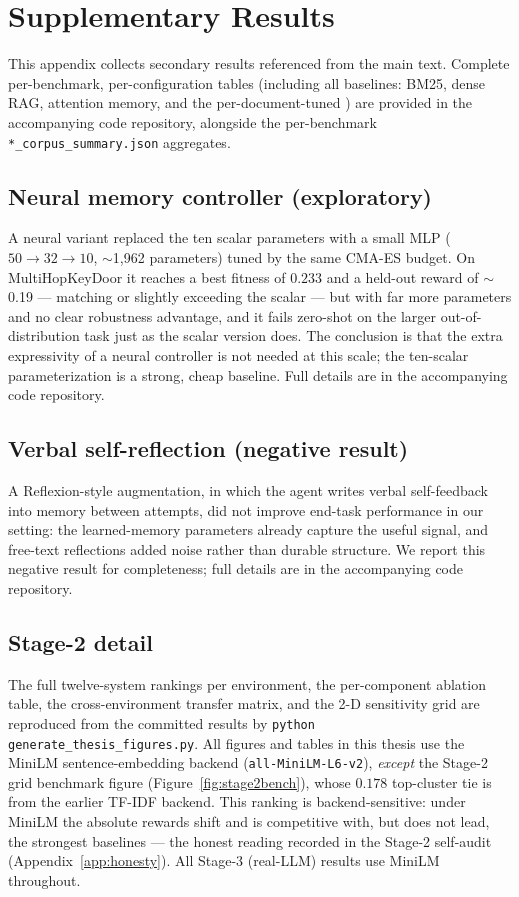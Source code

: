 \chapter{Supplementary Results}
\label{app:tables}

This appendix collects secondary results referenced from the main text. Complete
per-benchmark, per-configuration tables (including all baselines: BM25, dense
RAG, attention memory, and the per-document-tuned \Vt{}) are provided in the
accompanying code repository, alongside the per-benchmark
\texttt{*\_corpus\_summary.json} aggregates.

\section{Neural memory controller (exploratory)}
A neural variant replaced the ten scalar parameters with a small MLP
($50\rightarrow32\rightarrow10$, $\sim$1{,}962 parameters) tuned by the same
CMA-ES budget. On MultiHopKeyDoor it reaches a best fitness of $0.233$ and a
held-out reward of $\sim$0.19 --- matching or slightly exceeding the scalar
\Vfour{} --- but with far more parameters and no clear robustness advantage, and
it fails zero-shot on the larger out-of-distribution task just as the scalar
version does. The conclusion is that the extra expressivity of a neural
controller is not needed at this scale; the ten-scalar parameterization is a
strong, cheap baseline. Full details are in the accompanying code repository.

\section{Verbal self-reflection (negative result)}
A Reflexion-style \citep{shinn2023reflexion} augmentation, in which the agent
writes verbal self-feedback into memory between attempts, did not improve
end-task performance in our setting: the learned-memory parameters already
capture the useful signal, and free-text reflections added noise rather than
durable structure. We report this negative result for completeness; full details
are in the accompanying code repository.

\section{Stage-2 detail}
The full twelve-system rankings per environment, the per-component ablation
table, the cross-environment transfer matrix, and the 2-D sensitivity grid are
reproduced from the committed results by
\texttt{python generate\_thesis\_figures.py}. All figures and tables in this
thesis use the MiniLM sentence-embedding backend (\texttt{all-MiniLM-L6-v2}),
\emph{except} the Stage-2 grid benchmark figure (Figure~\ref{fig:stage2bench}),
whose $0.178$ top-cluster tie is from the earlier TF-IDF backend. This ranking is
backend-sensitive: under MiniLM the absolute rewards shift and \Vfour{} is
competitive with, but does not lead, the strongest baselines --- the honest
reading recorded in the Stage-2 self-audit (Appendix~\ref{app:honesty}). All
Stage-3 (real-LLM) results use MiniLM throughout.
